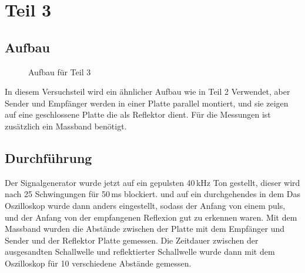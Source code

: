 \documentclass[11pt,a4paper]{article}
\begin{document}
\section{Teil 3}

\subsection{Aufbau}

\begin{figure}
	\centering \vspace{-20pt}
	\vspace{-5pt}
	\caption{Aufbau für Teil 3 \cite{Anleitung}}
	\label{abb3}
\end{figure}

In diesem Versuchsteil wird ein ähnlicher Aufbau wie in Teil 2 Verwendet, aber Sender und Empfänger werden in einer Platte parallel montiert, und sie zeigen auf eine geschlossene Platte die als Reflektor dient. Für die Messungen ist zusätzlich ein Massband benötigt. 

\subsection{Durchführung}

Der Signalgenerator wurde jetzt auf ein gepulsten 40\,kHz Ton gestellt, dieser wird nach 25 Schwingungen für 50\,ms blockiert. und auf ein durchgehendes in dem Das Oszilloskop wurde dann anders eingestellt, sodass der Anfang von einem puls, und der Anfang von der empfangenen Reflexion gut zu erkennen waren. Mit dem Massband wurden die Abstände zwischen der Platte mit dem Empfänger und Sender und der Reflektor Platte gemessen. Die Zeitdauer zwischen der ausgesandten Schallwelle und reflektierter Schallwelle wurde dann mit dem Oszilloskop für 10 verschiedene Abstände gemessen.
\end{document}
